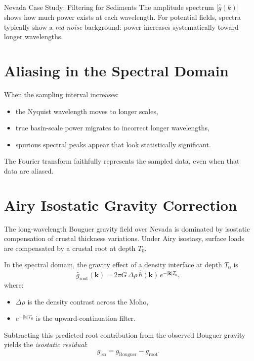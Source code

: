 \begin{activity}{Nevada Case Study: Filtering for Sediments}
The amplitude spectrum $|\hat{g}(k)|$ shows how much power exists at each wavelength.
For potential fields, spectra typically show a \emph{red-noise} background:
power increases systematically toward longer wavelengths.

\section*{Aliasing in the Spectral Domain}

When the sampling interval increases:
\begin{itemize}
  \item the Nyquist wavelength moves to longer scales,
  \item true basin-scale power migrates to incorrect longer wavelengths,
  \item spurious spectral peaks appear that look statistically significant.
\end{itemize}

The Fourier transform faithfully represents the sampled data,
even when that data are aliased.

\section*{Airy Isostatic Gravity Correction}

The long-wavelength Bouguer gravity field over Nevada is dominated by
isostatic compensation of crustal thickness variations.
Under Airy isostasy, surface loads are compensated by a crustal root at depth $T_0$.

In the spectral domain, the gravity effect of a density interface at depth $T_0$ is
\begin{equation}
\hat{g}_{\text{root}}(\mathbf{k})
=
2\pi G\, \Delta\rho \, \hat{h}(\mathbf{k}) \, e^{-|\mathbf{k}| T_0},
\end{equation}
where:
\begin{itemize}
  \item $\Delta\rho$ is the density contrast across the Moho,
  \item $e^{-|\mathbf{k}|T_0}$ is the upward-continuation filter.
\end{itemize}

Subtracting this predicted root contribution from the observed Bouguer gravity yields
the \emph{isostatic residual}:
\begin{equation}
g_{\text{iso}} = g_{\text{Bouguer}} - g_{\text{root}}.
\end{equation}


\end{activity}
